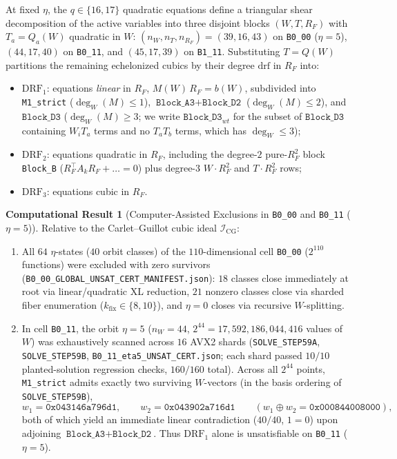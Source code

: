\documentclass[11pt,a4paper]{article}
\theoremstyle{definition}
\newtheorem{compresult}[theorem]{Computational Result}
\begin{document}
At fixed $\eta$, the $q \in \{16, 17\}$ quadratic equations define a triangular shear decomposition of the active variables into three disjoint blocks $(W, T, R_F)$ with $T_a = Q_a(W)$ quadratic in $W$: $(n_W, n_T, n_{R_F}) = (39, 16, 43)$ on \texttt{B0\_00} ($\eta=5$), $(44, 17, 40)$ on \texttt{B0\_11}, and $(45, 17, 39)$ on \texttt{B1\_11}. Substituting $T = Q(W)$ partitions the remaining echelonized cubics by their degree $\mathrm{drf}$ in $R_F$ into:
\begin{itemize}
  \item $\mathrm{DRF}_1$: equations \emph{linear} in $R_F$, $M(W)\,R_F = b(W)$, subdivided into \texttt{M1\_strict} ($\deg_W(M) \le 1$), $\texttt{Block\_A3} + \texttt{Block\_D2}$ ($\deg_W(M) \le 2$), and $\texttt{Block\_D3}$ ($\deg_W(M) \ge 3$; we write $\texttt{Block\_D3}_{wt}$ for the subset of $\texttt{Block\_D3}$ containing $W_i T_a$ terms and no $T_a T_b$ terms, which has $\deg_W \le 3$);
  \item $\mathrm{DRF}_2$: equations quadratic in $R_F$, including the degree-$2$ pure-$R_F^2$ block \texttt{Block\_B} ($R_F^\top A_k R_F + \dots = 0$) plus degree-$3$ $W\cdot R_F^2$ and $T \cdot R_F^2$ rows;
  \item $\mathrm{DRF}_3$: equations cubic in $R_F$.
\end{itemize}

\begin{compresult}[Computer-Assisted Exclusions in \texttt{B0\_00} and \texttt{B0\_11} ($\eta=5$)]
\label{res:exclusions}
Relative to the Carlet--Guillot cubic ideal $\mathcal{I}_{\mathrm{CG}}$:
\begin{enumerate}
  \item All $64$ $\eta$-states ($40$ orbit classes) of the $110$-dimensional cell \texttt{B0\_00} ($2^{110}$ functions) were excluded with zero survivors (\texttt{B0\_00\_GLOBAL\_UNSAT\_CERT\_MANIFEST.json}): $18$ classes close immediately at root via linear/quadratic XL reduction, $21$ nonzero classes close via sharded fiber enumeration ($k_{\mathrm{fix}} \in \{8, 10\}$), and $\eta=0$ closes via recursive $W$-splitting.
  \item In cell \texttt{B0\_11}, the orbit $\eta=5$ ($n_W = 44$, $2^{44} = 17{,}592{,}186{,}044{,}416$ values of $W$) was exhaustively scanned across $16$ AVX2 shards (\texttt{SOLVE\_STEP59A}, \texttt{SOLVE\_STEP59B}, \texttt{B0\_11\_eta5\_UNSAT\_CERT.json}; each shard passed $10/10$ planted-solution regression checks, $160/160$ total). Across all $2^{44}$ points, \texttt{M1\_strict} admits exactly two surviving $W$-vectors (in the basis ordering of \texttt{SOLVE\_STEP59B}),
  \[
    w_1 = \texttt{0x043146a796d1}, \qquad w_2 = \texttt{0x043902a716d1} \qquad (w_1 \oplus w_2 = \texttt{0x000844008000}),
  \]
  both of which yield an immediate linear contradiction ($40/40$, $1=0$) upon adjoining $\texttt{Block\_A3} + \texttt{Block\_D2}$. Thus $\mathrm{DRF}_1$ alone is unsatisfiable on \texttt{B0\_11} ($\eta=5$).
\end{enumerate}
\end{compresult}
\end{document}
